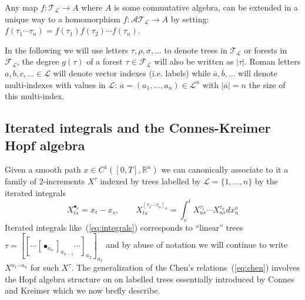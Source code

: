 \documentclass[a4paper]{article}
\newcommand{\ol}[1]{\overline{#1}}
\newcommand{\1}{{\bf 1}}
\newcommand{\RR}{\mathbb{R}}
\newcommand{\FF}{\mathcal{F}}
\newcommand{\LL}{\mathcal{L}}
\newcommand{\cl}{\mathcal L}
\newcommand{\TT}{\mathcal{T}}
\newcommand{\cA}{\mathcal{A}}
\newcommand{\troot}{\bullet}
\newcommand{\RR}{\mathbb{R}}
\begin{document}
Any map $f : \TT_\cl \to
A$ where $A$ is some commutative algebra, can be extended in a unique way to
a homomorphism $f : \cA
\TT_\cl \to A$ by setting:
$
f(\tau_1 \cdots \tau_n) = f(\tau_1) f(\tau_2) \cdots  f(\tau_n)
$.


In the following we will use letters $\tau,\rho,\sigma,\dots$ to
denote trees in $\TT_\cl$ or forests  in $\FF_\LL$, the degree $g(\tau)$ of a forest $\tau \in \FF_\cl$ will also be written as $|\tau|$. Roman letters $a,b,c,\dots \in \LL$ will denote vector  indexes (i.e. labels) while $\ol{a},\ol{b},\dots$ will denote multi-indexes with values in $\LL$: $\overline{a}=(a_1,\dots,a_n) \in \LL^n$ with $|\overline a|=n$ the size of this multi-index.






\subsection{Iterated integrals and the Connes-Kreimer Hopf algebra}
Given a smooth path $x \in C^1([0,T],\RR^n)$ we can canonically
associate to it a family of 2-increments $X^\tau$ indexed by trees
labelled by $\LL = \{1,\dots,n\}$ by the iterated integrals
\begin{equation}
  \label{eq:tree-integrals}
X^{\troot_a}_{ts} = x_t-x_s, \qquad X^{[\tau_1 \cdots \tau_n]_a}_{ts}
= \int_s^t X^{\tau_1}_{us} \cdots  X^{\tau_n}_{us} dx^a_u
\end{equation}
Iterated integrals like~(\ref{eq:integrals}) corresponds to ``linear''
trees $\tau = [[\cdots [\troot_{a_n}]_{a_{n-1}}
\cdots]_{a_2}]_{a_1}$ and by abuse of notation we will
continue to write $X^{a_1 \cdots a_n}$ for such $X^\tau$.
The generalization of the Chen's relations~(\ref{eq:chen}) involves
the Hopf algebra structure on on labelled
trees essentially introduced by Connes and Kreimer which we now
brefly describe.
\end{document}

